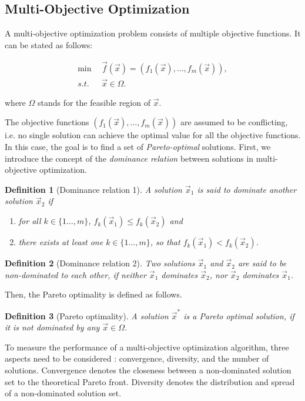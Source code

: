 \documentclass[10pt,journal,compsoc]{IEEEtran}
\newtheorem{definition}{Definition}
\begin{document}
\subsection{Multi-Objective Optimization}

A multi-objective optimization problem consists of multiple objective functions. It can be stated as follows:
\begin{small}
\begin{align}
\min \ \ & \vec{f}(\vec{x}) = (f_1(\vec{x}), \dots, f_m(\vec{x})), \\
s.t. \ \ & \vec{x} \in \Omega.
\end{align}
\end{small}
where $\Omega$ stands for the feasible region of $\vec{x}$.

The objective functions $(f_1(\vec{x}), \dots, f_m(\vec{x}))$ are assumed to be conflicting, i.e. no single solution can achieve the optimal value for all the objective functions. In this case, the goal is to find a set of \emph{Pareto-optimal} solutions. First, we introduce the concept of the \emph{dominance relation} between solutions in multi-objective optimization.
\begin{definition}[Dominance relation 1]
	A solution $\vec{x}_1$ is said to \emph{dominate} another solution $\vec{x}_2$ if 
	\begin{enumerate}
		\item for all $k \in \{1 \dots, m\}$, $f_k(\vec{x}_1) \leq f_k(\vec{x}_2)$ and
		\item there exists at least one $k \in \{1 \dots, m\}$, so that $f_k(\vec{x}_1) < f_k(\vec{x}_2)$.
	\end{enumerate}
\end{definition}
\begin{definition}[Dominance relation 2]
	Two solutions $\vec{x}_1$ and $\vec{x}_2$ are said to be \emph{non-dominated} to each other, if \emph{neither $\vec{x}_1$ dominates $\vec{x}_2$, nor $\vec{x}_2$ dominates $\vec{x}_1$}.
\end{definition}
Then, the Pareto optimality is defined as follows.
\begin{definition}[Pareto optimality]
	A solution $\vec{x}^*$ is a \emph{Pareto optimal solution}, if it is not dominated by any $\vec{x} \in \Omega$.
\end{definition}


To measure the performance of a multi-objective optimization algorithm, three aspects need to be considered \cite{Okabe:je,7360024}: convergence, diversity, and the number of solutions.
Convergence denotes the closeness between a non-dominated solution set to the theoretical Pareto front. Diversity denotes the distribution and spread of a non-dominated solution set.
\end{document}
